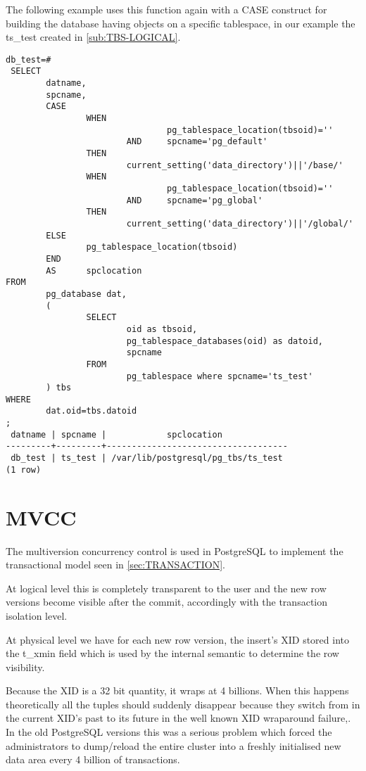 The following example uses this function again with a CASE construct for building the database having 
objects on a specific tablespace, in our example the ts\_test created in \ref{sub:TBS-LOGICAL}.\newpage
\begin{lstlisting}[style=pgsql]
 db_test=# 
 SELECT
        datname,
        spcname,
        CASE
                WHEN 
                                pg_tablespace_location(tbsoid)=''
                        AND     spcname='pg_default'
                THEN
                        current_setting('data_directory')||'/base/'
                WHEN 
                                pg_tablespace_location(tbsoid)=''
                        AND     spcname='pg_global'
                THEN
                        current_setting('data_directory')||'/global/'
        ELSE
                pg_tablespace_location(tbsoid)
        END
        AS      spclocation
FROM
        pg_database dat,
        (
                SELECT
                        oid as tbsoid,
                        pg_tablespace_databases(oid) as datoid,
                        spcname 
                FROM 
                        pg_tablespace where spcname='ts_test'
        ) tbs
WHERE
        dat.oid=tbs.datoid
;
 datname | spcname |            spclocation             
---------+---------+------------------------------------
 db_test | ts_test | /var/lib/postgresql/pg_tbs/ts_test
(1 row)

\end{lstlisting}



\section{MVCC} \label{sec:MVCC} 
The multiversion concurrency control is used in PostgreSQL to implement the  transactional model seen in 
\ref{sec:TRANSACTION}.\newline

At logical level this is completely transparent to the user and the new row versions become visible 
after the commit, accordingly with the transaction isolation level. \newline

At physical level we have for each new row version, the insert's XID stored into the t\_xmin field which is 
used by the internal semantic to determine the row visibility. 

Because the XID is a 32 bit quantity, it wraps at 4 billions. When this happens theoretically all 
the tuples should suddenly disappear because they switch from in the current XID's past to its future in 
the well known XID wraparound failure,. In the old PostgreSQL versions this 
was a serious problem which forced the administrators to dump/reload the entire cluster into a freshly 
initialised new data area every 4 billion of transactions.\newline 

